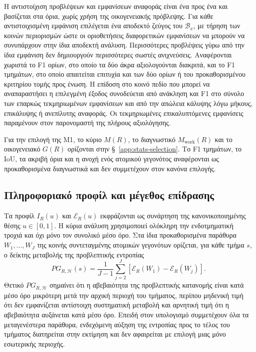 \documentclass[11pt,a4paper]{article}
\begin{document}
Η αντιστοίχιση προβλέψεων και εμφανίσεων αναφοράς είναι ένα προς ένα και βασίζεται στα όρια, χωρίς χρήση της οικογενειακής πρόβλεψης. Για κάθε αντιστοιχισμένη εμφάνιση επιλέγεται ένα αποδεκτό ζεύγος του $\mathcal B_x$, με τήρηση των κοινών περιορισμών ώστε οι οριοθετήσεις διαφορετικών εμφανίσεων να μπορούν να συνυπάρχουν στην ίδια αποδεκτή ανάλυση. Περισσότερες προβλέψεις γύρω από την ίδια εμφάνιση δεν δημιουργούν περισσότερες σωστές ανιχνεύσεις. Αναφέρονται χωριστά το F1 ορίων, στο οποίο τα δύο άκρα αξιολογούνται διακριτά, και το F1 τμημάτων, στο οποίο απαιτείται επιτυχία και των δύο ορίων ή του προκαθορισμένου κριτηρίου τομής προς ένωση. Η επίδοση στο κοινό πεδίο που μπορεί να αναπαραστήσει η επιλεγμένη έξοδος συνοδεύεται από ανάκληση και F1 στο σύνολο των επαρκώς τεκμηριωμένων εμφανίσεων και από την απώλεια κάλυψης λόγω μήκους, επικάλυψης ή ανεπίλυτης αναφοράς. Οι τεκμηριωμένες επικαλυπτόμενες εμφανίσεις παραμένουν στον παρονομαστή της πλήρους αξιολόγησης.

Για την επιλογή της M1, το κύριο \(M(R)\), το διαγνωστικό \(M_{\mathrm{work}}(R)\) και το οικογενειακό \(G(R)\) ορίζονται στην §~\ref{app:stats-selection}. Το F1 τμημάτων, το IoU, τα ακριβή όρια και η ανοχή ενός ατομικού γεγονότος αναφέρονται ως προκαθορισμένα διαγνωστικά και δεν συμμετέχουν στον κανόνα επιλογής.

\subsection{Πληροφοριακό προφίλ και μέγεθος επίδρασης}\label{app:stats-axisB}

Τα προφίλ \(I_R(u)\) και \(\mathcal{E}_R(u)\) εκφράζονται ως συνάρτηση της κανονικοποιημένης θέσης \(u\in[0,1]\). Η κύρια ανάλυση χρησιμοποιεί ολόκληρη την ενδοτμηματική τροχιά και όχι μόνο τον συνολικό μέσο όρο. Στα ίδια προκαθορισμένα παράθυρα \(W_1,\ldots,W_J\) της κοινής συντεταγμένης ατομικών γεγονότων ορίζεται, για κάθε τμήμα \(s\), ο δείκτης μεταβολής της προβλεπτικής εντροπίας
\[
PG_{R,\mathcal H}(s)
=
\frac{1}{J-1}
\sum_{j=2}^{J}
\left[
\mathcal E_R(W_1)-\mathcal E_R(W_j)
\right].
\]
Θετικό \(PG_{R,\mathcal H}\) σημαίνει ότι η αβεβαιότητα της προβλεπτικής κατανομής είναι κατά μέσο όρο μικρότερη μετά την αρχική περιοχή του τμήματος, περίπου μηδενική τιμή ότι δεν εμφανίζεται αντίστοιχη συστηματική μεταβολή και αρνητική τιμή ότι η αβεβαιότητα αυξάνεται κατά μέσο όρο. Επειδή στον υπολογισμό συμμετέχουν όλα τα μεταγενέστερα παράθυρα, ενδεχόμενη αύξηση της εντροπίας προς το τέλος του τμήματος διατηρείται στην εκτίμηση και δεν αφαιρείται με επιλογή μιας μόνο εσωτερικής περιοχής.
\end{document}
